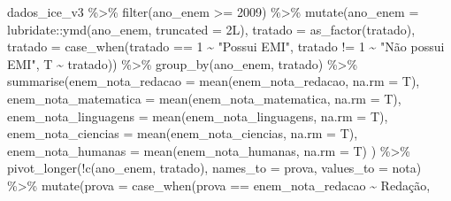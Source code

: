 \documentclass[
  letterpaper,
  DIV=11,
  numbers=noendperiod]{scrartcl}
\newenvironment{Shaded}{\begin{snugshade}}{\end{snugshade}}
\newcommand{\AttributeTok}[1]{\textcolor[rgb]{0.40,0.45,0.13}{#1}}
\newcommand{\DecValTok}[1]{\textcolor[rgb]{0.68,0.00,0.00}{#1}}
\newcommand{\FunctionTok}[1]{\textcolor[rgb]{0.28,0.35,0.67}{#1}}
\newcommand{\NormalTok}[1]{\textcolor[rgb]{0.00,0.23,0.31}{#1}}
\newcommand{\SpecialCharTok}[1]{\textcolor[rgb]{0.37,0.37,0.37}{#1}}
\newcommand{\StringTok}[1]{\textcolor[rgb]{0.13,0.47,0.30}{#1}}
\begin{document}
\begin{Shaded}
\begin{Highlighting}[]
\NormalTok{dados\_ice\_v3 }\SpecialCharTok{\%\textgreater{}\%} 
  \FunctionTok{filter}\NormalTok{(ano\_enem }\SpecialCharTok{\textgreater{}=} \DecValTok{2009}\NormalTok{) }\SpecialCharTok{\%\textgreater{}\%} 
    \FunctionTok{mutate}\NormalTok{(}\AttributeTok{ano\_enem =}\NormalTok{ lubridate}\SpecialCharTok{::}\FunctionTok{ymd}\NormalTok{(ano\_enem, }\AttributeTok{truncated =} \DecValTok{2}\NormalTok{L),}
           \AttributeTok{tratado =} \FunctionTok{as\_factor}\NormalTok{(tratado),}
           \AttributeTok{tratado =} \FunctionTok{case\_when}\NormalTok{(tratado }\SpecialCharTok{==} \DecValTok{1} \SpecialCharTok{\textasciitilde{}} \StringTok{"Possui EMI"}\NormalTok{,}
\NormalTok{                               tratado }\SpecialCharTok{!=} \DecValTok{1} \SpecialCharTok{\textasciitilde{}} \StringTok{"Não possui EMI"}\NormalTok{,}
\NormalTok{                               T }\SpecialCharTok{\textasciitilde{}}\NormalTok{ tratado)) }\SpecialCharTok{\%\textgreater{}\%}
    \FunctionTok{group\_by}\NormalTok{(ano\_enem, tratado) }\SpecialCharTok{\%\textgreater{}\%} 
    \FunctionTok{summarise}\NormalTok{(}\AttributeTok{enem\_nota\_redacao =} \FunctionTok{mean}\NormalTok{(enem\_nota\_redacao, }\AttributeTok{na.rm =}\NormalTok{ T),}
              \AttributeTok{enem\_nota\_matematica =} \FunctionTok{mean}\NormalTok{(enem\_nota\_matematica, }\AttributeTok{na.rm =}\NormalTok{ T),}
              \AttributeTok{enem\_nota\_linguagens =} \FunctionTok{mean}\NormalTok{(enem\_nota\_linguagens, }\AttributeTok{na.rm =}\NormalTok{ T),}
              \AttributeTok{enem\_nota\_ciencias =} \FunctionTok{mean}\NormalTok{(enem\_nota\_ciencias, }\AttributeTok{na.rm =}\NormalTok{ T),}
              \AttributeTok{enem\_nota\_humanas =} \FunctionTok{mean}\NormalTok{(enem\_nota\_humanas, }\AttributeTok{na.rm =}\NormalTok{ T)}
\NormalTok{              ) }\SpecialCharTok{\%\textgreater{}\%}
  \FunctionTok{pivot\_longer}\NormalTok{(}\SpecialCharTok{!}\FunctionTok{c}\NormalTok{(ano\_enem, tratado), }
               \AttributeTok{names\_to =} \StringTok{\textquotesingle{}prova\textquotesingle{}}\NormalTok{,}
               \AttributeTok{values\_to =} \StringTok{\textquotesingle{}nota\textquotesingle{}}\NormalTok{) }\SpecialCharTok{\%\textgreater{}\%} 
  \FunctionTok{mutate}\NormalTok{(}\AttributeTok{prova =} \FunctionTok{case\_when}\NormalTok{(prova }\SpecialCharTok{==} \StringTok{\textquotesingle{}enem\_nota\_redacao\textquotesingle{}} \SpecialCharTok{\textasciitilde{}} \StringTok{\textquotesingle{}Redação\textquotesingle{}}\NormalTok{,}

\end{Highlighting}
\end{Shaded}
\end{document}
